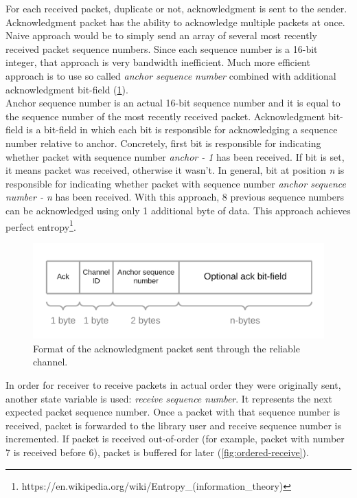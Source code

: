 \documentclass[times, utf8, diplomski]{fer}
\begin{document}
For each received packet, duplicate or not, acknowledgment is sent to the sender. Acknowledgment packet has the ability to acknowledge multiple packets at once. Naive approach would be to simply send an array of several most recently received packet sequence numbers. Since each sequence number is a 16-bit integer, that approach is very bandwidth inefficient. Much more efficient approach is to use so called \textit{anchor sequence number} combined with additional acknowledgment bit-field (\ref{fig:ack-packet-structure}). \\

Anchor sequence number is an actual 16-bit sequence number and it is equal to the sequence number of the most recently received packet. Acknowledgment bit-field is a bit-field in which each bit is responsible for acknowledging a sequence number relative to anchor. Concretely, first bit is responsible for indicating whether packet with sequence number \textit{anchor - 1} has been received. If bit is set, it means packet was received, otherwise it wasn't. In general, bit at position \textit{n} is responsible for indicating whether packet with sequence number \textit{anchor sequence number - n} has been received. With this approach, 8 previous sequence numbers can be acknowledged using only 1 additional byte of data. This approach achieves perfect entropy\footnote{https://en.wikipedia.org/wiki/Entropy\_(information\_theory)}.\\

\begin{figure}[H]
	\centering
	\includegraphics[scale=0.25]{Ack-packet-structure}
	\caption{Format of the acknowledgment packet sent through the reliable channel.}
	\label{fig:ack-packet-structure}
\end{figure}

In order for receiver to receive packets in actual order they were originally sent, another state variable is used: \textit{receive sequence number}. It represents the next expected packet sequence number. Once a packet with that sequence number is received, packet is forwarded to the library user and receive sequence number is incremented. If packet is received out-of-order (for example, packet with number 7 is received before 6), packet is buffered for later (\ref{fig:ordered-receive}).
\end{document}
